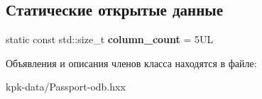 \subsection*{Статические открытые данные}
\begin{DoxyCompactItemize}
\item 
static const std\+::size\+\_\+t {\bfseries column\+\_\+count} = 5\+UL\hypertarget{classodb_1_1access_1_1composite__value__traits_3_01_1_1kpk_1_1data_1_1_passport_00_01id__pgsql_01_4_a51b787b52f68914d41a4e8992903318a}{}\label{classodb_1_1access_1_1composite__value__traits_3_01_1_1kpk_1_1data_1_1_passport_00_01id__pgsql_01_4_a51b787b52f68914d41a4e8992903318a}

\end{DoxyCompactItemize}


Объявления и описания членов класса находятся в файле\+:\begin{DoxyCompactItemize}
\item 
kpk-\/data/Passport-\/odb.\+hxx\end{DoxyCompactItemize}
